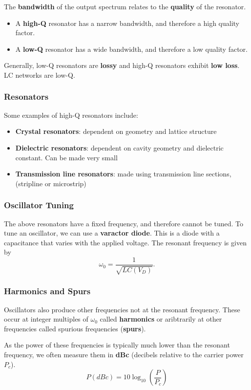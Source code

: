 \documentclass{article}
\begin{document}
The \textbf{bandwidth} of the output spectrum relates to the
\textbf{quality} of the resonator.
\begin{itemize}
    \item A \textbf{high-Q} resonator has a narrow bandwidth, and
          therefore a high quality factor.
    \item A \textbf{low-Q} resonator has a wide bandwidth, and
          therefore a low quality factor.
\end{itemize}
Generally, low-Q resonators are \textbf{lossy} and high-Q resonators
exhibit \textbf{low loss}. LC networks are low-Q.
\subsubsection{Resonators}
Some examples of high-Q resonators include:
\begin{itemize}
    \item \textbf{Crystal resonators}: dependent on geometry and lattice structure
    \item \textbf{Dielectric resonators}: dependent on cavity geometry and dielectric constant. Can be made very small
    \item \textbf{Transmission line resonators}: made using transmission line sections, (stripline or microstrip)
\end{itemize}
\subsubsection{Oscillator Tuning}
The above resonators have a fixed frequency, and therefore cannot be
tuned. To tune an oscillator, we can use a \textbf{varactor diode}.
This is a diode with a capacitance that varies with the applied
voltage. The resonant frequency is given by
\begin{equation*}
    \omega_0 = \frac{1}{\sqrt{L C\left( V_D \right)}}.
\end{equation*}
\subsubsection{Harmonics and Spurs}
Oscillators also produce other frequencies not at the resonant
frequency. These occur at integer multiples of \(\omega_0\) called
\textbf{harmonics} or aribtrarily at other frequencies called spurious
frequencies (\textbf{spurs}).

As the power of these frequencies is typically much lower than the
resonant frequency, we often measure them in \textbf{dBc} (decibels
relative to the carrier power \(P_c\)).
\begin{equation*}
    P (\unit{dBc}) = 10 \log_{10}{\left( \frac{P}{P_c} \right)}
\end{equation*}
\end{document}

